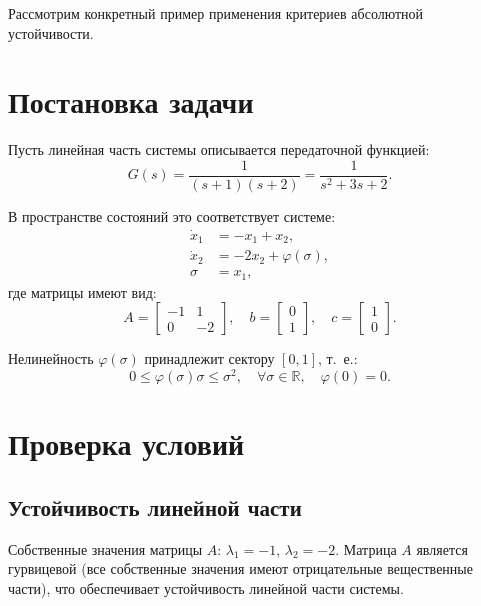 Рассмотрим конкретный пример применения критериев абсолютной устойчивости.

\section{Постановка задачи}

Пусть линейная часть системы описывается передаточной функцией:
\begin{equation}
    G(s) = \frac{1}{(s+1)(s+2)} = \frac{1}{s^2 + 3s + 2}.
\end{equation}

В пространстве состояний это соответствует системе:
\begin{equation}
    \begin{aligned}
        \dot x_1 &= -x_1 + x_2,\\
        \dot x_2 &= -2x_2 + \varphi(\sigma),\\
        \sigma &= x_1,
    \end{aligned}
\end{equation}
где матрицы имеют вид:
\begin{equation}
    A = \begin{bmatrix} -1 & 1 \\ 0 & -2 \end{bmatrix}, \quad
    b = \begin{bmatrix} 0 \\ 1 \end{bmatrix}, \quad
    c = \begin{bmatrix} 1 \\ 0 \end{bmatrix}.
\end{equation}

Нелинейность $\varphi(\sigma)$ принадлежит сектору $[0, 1]$, т.~е.:
\begin{equation}
    0 \le \varphi(\sigma)\sigma \le \sigma^2, \quad \forall \sigma\in\mathbb{R}, \quad \varphi(0)=0.
\end{equation}

\section{Проверка условий}

\subsection{Устойчивость линейной части}

Собственные значения матрицы $A$: $\lambda_1 = -1$, $\lambda_2 = -2$. Матрица $A$ является гурвицевой (все собственные значения имеют отрицательные вещественные части), что обеспечивает устойчивость линейной части системы.

